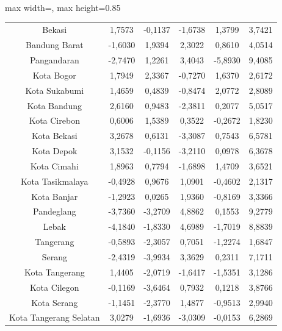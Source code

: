 \begin{table}[H]
\begin{adjustbox}{max width=\textwidth, max height=0.85\textheight}
\begin{tabular}{|c|c|c|c|c|c|}
Bekasi & 1,7573 & -0,1137 & -1,6738 & 1,3799 & 3,7421 \\
Bandung Barat & -1,6030 & 1,9394 & 2,3022 & 0,8610 & 4,0514 \\
Pangandaran & -2,7470 & 1,2261 & 3,4043 & -5,8930 & 9,4085 \\
Kota Bogor & 1,7949 & 2,3367 & -0,7270 & 1,6370 & 2,6172 \\
Kota Sukabumi & 1,4659 & 0,4839 & -0,8474 & 2,0772 & 2,8089 \\
Kota Bandung & 2,6160 & 0,9483 & -2,3811 & 0,2077 & 5,0517 \\
Kota Cirebon & 0,6006 & 1,5389 & 0,3522 & -0,2672 & 1,8230 \\
Kota Bekasi & 3,2678 & 0,6131 & -3,3087 & 0,7543 & 6,5781 \\
Kota Depok & 3,1532 & -0,1156 & -3,2110 & 0,0978 & 6,3678 \\
Kota Cimahi & 1,8963 & 0,7794 & -1,6898 & 1,4709 & 3,6521 \\
Kota Tasikmalaya & -0,4928 & 0,9676 & 1,0901 & -0,4602 & 2,1317 \\
Kota Banjar & -1,2923 & 0,0265 & 1,9360 & -0,8169 & 3,3366 \\
Pandeglang & -3,7360 & -3,2709 & 4,8862 & 0,1553 & 9,2779 \\
Lebak & -4,1840 & -1,8330 & 4,6989 & -1,7019 & 8,8839 \\
Tangerang & -0,5893 & -2,3057 & 0,7051 & -1,2274 & 1,6847 \\
Serang & -2,4319 & -3,9934 & 3,3629 & 0,2311 & 7,1711 \\
Kota Tangerang & 1,4405 & -2,0719 & -1,6417 & -1,5351 & 3,1286 \\
Kota Cilegon & -0,1169 & -3,6464 & 0,7932 & 0,1218 & 3,8766 \\
Kota Serang & -1,1451 & -2,3770 & 1,4877 & -0,9513 & 2,9940 \\
Kota Tangerang Selatan & 3,0279 & -1,6936 & -3,0309 & -0,0153 & 6,2869 \\
\hline
\end{tabular}
\end{adjustbox}
\end{table}